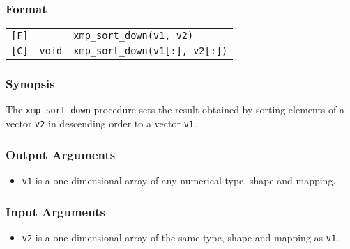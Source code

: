 \subsubsection*{Format}

\begin{tabular}{lll}

\verb![F]!&            & {\tt xmp\_sort\_down(v1, v2)}\\

\verb![C]!& {\tt void} & {\tt xmp\_sort\_down(v1[:], v2[:])}\\

\end{tabular}

\subsubsection*{Synopsis}

The {\tt xmp\_sort\_down} procedure sets the result obtained by
sorting elements of a vector {\tt v2} in descending order to a vector
{\tt v1}.

\subsubsection*{Output Arguments}
\begin{itemize}
 \item {\tt v1} is a one-dimensional array of any numerical type,
       shape and mapping.
\end{itemize}

\subsubsection*{Input Arguments}
\begin{itemize}
 \item {\tt v2} is a one-dimensional array of the same type, shape and
       mapping as {\tt v1}.
\end{itemize}


